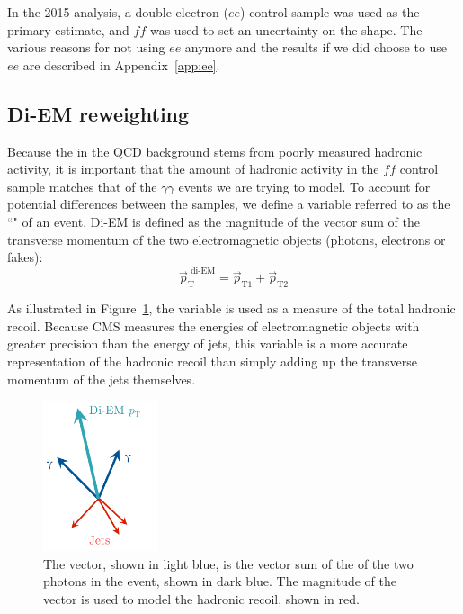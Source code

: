 In the 2015 analysis, a double electron ($ee$) control sample was used as the primary estimate, and $ff$ was used to set an uncertainty on the \ETmiss shape. The various reasons for not using $ee$ anymore and the results if we did choose to use $ee$ are described in Appendix~\ref{app:ee}.

\subsection{Di-EM \pT reweighting}
\label{sec:diempt}

Because the \ETmiss in the QCD background stems from poorly measured hadronic activity, it is important that the amount of hadronic activity in the $ff$ control sample matches that of the $\gamma\gamma$ events we are trying to model.
To account for potential differences between the samples, we define a variable referred to as the ``\diempt" of an event. Di-EM \pT is defined as the magnitude of
the vector sum of the transverse momentum of the two electromagnetic objects (photons, electrons or fakes):
\begin{equation}
 \vec{p}_\mathrm{T}^{\, \,\mathrm{di\mbox{-}EM}}=\vec{p}_{\mathrm{T}1}+\vec{p}_{\mathrm{T}2}
 \label{equ:diempt}
\end{equation}

As illustrated in Figure~\ref{fig:diempt}, the \diempt variable is used as a measure of the total hadronic recoil. Because CMS measures the energies of electromagnetic objects with greater precision than the energy of jets, this variable is a more accurate representation of the hadronic recoil than simply adding up the transverse momentum of the jets themselves. 

\begin{figure}[h]
\begin{center}
\includegraphics[width=0.3\textwidth]{Figures/DataAnalysis/Diempt.pdf}
\end{center}
\caption[Illustration showing how the \diempt vector is defined.]
{The \diempt vector, shown in light blue, is the vector sum of the \pT of the two photons in the event, shown in dark blue. The magnitude of the \diempt vector is used to model the hadronic recoil, shown in red. }
\label{fig:diempt}
\end{figure}

